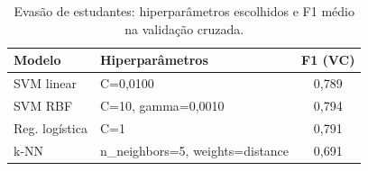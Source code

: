 \begin{table}[!t]
\centering
\caption{Evasão de estudantes: hiperparâmetros escolhidos e F1 médio na validação cruzada.}
\label{tab:estudantes_hiper}
\begin{tabular}{llc}
\hline
Modelo & Hiperparâmetros & F1 (VC) \\
\hline
SVM linear & C=0,0100 & 0,789 \\
SVM RBF & C=10, gamma=0,0010 & 0,794 \\
Reg. logística & C=1 & 0,791 \\
k-NN & n_neighbors=5, weights=distance & 0,691 \\
\hline
\end{tabular}
\end{table}